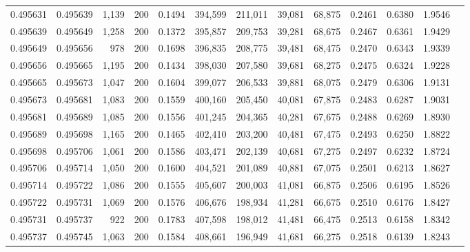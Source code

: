 \begin{tabular}{rrrrrrrrrrrrr}
0.495631 & 0.495639 & 1,139 & 200 &                                     0.1494 & 394,599 & 211,011 &  39,081 &  68,875 & 0.2461 & 0.6380 & 1.9546 \\
0.495639 & 0.495649 & 1,258 & 200 &                                     0.1372 & 395,857 & 209,753 &  39,281 &  68,675 & 0.2467 & 0.6361 & 1.9429 \\
0.495649 & 0.495656 &   978 & 200 &                                     0.1698 & 396,835 & 208,775 &  39,481 &  68,475 & 0.2470 & 0.6343 & 1.9339 \\
0.495656 & 0.495665 & 1,195 & 200 &                                     0.1434 & 398,030 & 207,580 &  39,681 &  68,275 & 0.2475 & 0.6324 & 1.9228 \\
0.495665 & 0.495673 & 1,047 & 200 &                                     0.1604 & 399,077 & 206,533 &  39,881 &  68,075 & 0.2479 & 0.6306 & 1.9131 \\
0.495673 & 0.495681 & 1,083 & 200 &                                     0.1559 & 400,160 & 205,450 &  40,081 &  67,875 & 0.2483 & 0.6287 & 1.9031 \\
0.495681 & 0.495689 & 1,085 & 200 &                                     0.1556 & 401,245 & 204,365 &  40,281 &  67,675 & 0.2488 & 0.6269 & 1.8930 \\
0.495689 & 0.495698 & 1,165 & 200 &                                     0.1465 & 402,410 & 203,200 &  40,481 &  67,475 & 0.2493 & 0.6250 & 1.8822 \\
0.495698 & 0.495706 & 1,061 & 200 &                                     0.1586 & 403,471 & 202,139 &  40,681 &  67,275 & 0.2497 & 0.6232 & 1.8724 \\
0.495706 & 0.495714 & 1,050 & 200 &                                     0.1600 & 404,521 & 201,089 &  40,881 &  67,075 & 0.2501 & 0.6213 & 1.8627 \\
0.495714 & 0.495722 & 1,086 & 200 &                                     0.1555 & 405,607 & 200,003 &  41,081 &  66,875 & 0.2506 & 0.6195 & 1.8526 \\
0.495722 & 0.495731 & 1,069 & 200 &                                     0.1576 & 406,676 & 198,934 &  41,281 &  66,675 & 0.2510 & 0.6176 & 1.8427 \\
0.495731 & 0.495737 &   922 & 200 &                                     0.1783 & 407,598 & 198,012 &  41,481 &  66,475 & 0.2513 & 0.6158 & 1.8342 \\
0.495737 & 0.495745 & 1,063 & 200 &                                     0.1584 & 408,661 & 196,949 &  41,681 &  66,275 & 0.2518 & 0.6139 & 1.8243 \\

\end{tabular}
